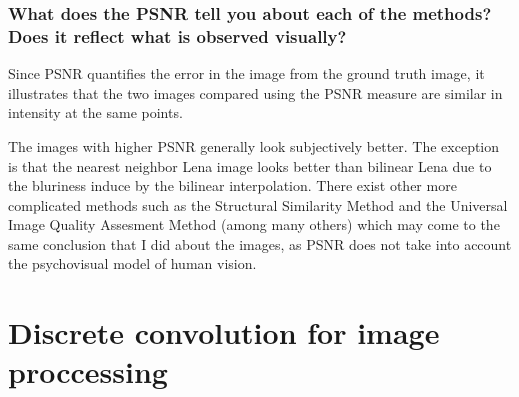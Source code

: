 \documentclass[article, 1.5space, letterpaper, 12pt, oneside, header, footer]{SydeClass}
\begin{document}
\subsubsection{What does the PSNR tell you about each of the methods? Does it reflect what is observed visually?}

Since PSNR quantifies the error in the image from the ground truth image, it illustrates that the two images compared using the PSNR measure are similar in intensity at the same points.

The images with higher PSNR generally look subjectively better. The exception is that the nearest neighbor Lena image looks better than bilinear Lena due to the bluriness induce by the bilinear interpolation. There exist other more complicated methods such as the Structural Similarity Method \cite{ssim-image-qual} and the Universal Image Quality Assesment Method \cite{universal-image-qual} (among many others) which may come to the same conclusion that I did about the images, as PSNR does not take into account the psychovisual model of human vision.


\clearpage
\section{Discrete convolution for image proccessing}
\end{document}
